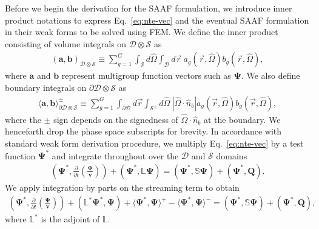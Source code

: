 Before we begin the derivation for the \gls{SAAF} formulation, we introduce inner product notations
to express Eq.\ \ref{eq:nte-vec} and the eventual \gls{SAAF} formulation in their weak forms to be
solved using \gls{FEM}. We define the inner product consisting of volume integrals on
$\mathcal{D}\otimes\mathcal{S}$ as
%
\begin{gather}
  (\bm{a}, \bm{b})_{\mathcal{D}\otimes\mathcal{S}} \equiv
  \sum^G_{g=1}\int_\mathcal{S}d\hat{\Omega}\int_\mathcal{D}d\vec{r}\
  a_g(\vec{r},\hat{\Omega}) b_g(\vec{r},\hat{\Omega}), \label{eq:weak-domain}
\end{gather}
%
where $\bm{a}$ and $\bm{b}$ represent multigroup function vectors such as $\bm{\Psi}$. We also
define boundary integrals on $\partial\mathcal{D}\otimes\mathcal{S}$ as
%
\begin{gather}
  \langle\bm{a},\bm{b}\rangle^\pm_{\partial\mathcal{D}\otimes\mathcal{S}} \equiv
  \sum^G_{g=1}\int_{\partial\mathcal{D}}d\vec{r}
  \int_{\mathcal{S}^{\pm}}d\hat{\Omega}\ |\hat{\Omega}\cdot\hat{n}_b|
  a_g(\vec{r},\hat{\Omega}) b_g(\vec{r},\hat{\Omega}), \label{eq:weak-boundary}
\end{gather}
%
where the $\pm$ sign depends on the signedness of $\hat{\Omega}\cdot\hat{n}_b$ at the boundary.
We henceforth drop the phase space subscripts for brevity.
%
In accordance with standard weak form derivation procedure, we multiply Eq.\ \ref{eq:nte-vec}
by a test function $\bm{\Psi}^*$ and integrate throughout over the $\mathcal{D}$ and $\mathcal{S}$
domains
%
\begin{gather}
  \left(\bm{\Psi}^*,\frac{\partial}{\partial t}\left(\frac{\bm{\Psi}}{\bm{v}}\right)\right) +
  \left(\bm{\Psi}^*,\mathbb{L}\bm{\Psi}\right) = \left(\bm{\Psi}^*,\mathbb{S}\bm{\Psi}\right) +
  \left(\bm{\Psi}^*,\bm{Q}\right).
\end{gather}
%
We apply integration by parts on the streaming term to obtain
%
\begin{gather}
  \left(\bm{\Psi}^*,\frac{\partial}{\partial t}\left(\frac{\bm{\Psi}}{\bm{v}}\right)\right) +
  \left(\mathbb{L}^*\bm{\Psi}^*,\bm{\Psi}\right) + \langle\bm{\Psi}^*,\bm{\Psi}\rangle^+ -
  \langle\bm{\Psi}^*,\bm{\Psi}\rangle^- = \left(\bm{\Psi}^*,\mathbb{S}\bm{\Psi}\right) +
  \left(\bm{\Psi}^*,\bm{Q}\right), \label{eq:nte-weak}
\end{gather}
%
where $\mathbb{L}^*$ is the adjoint of $\mathbb{L}$.

